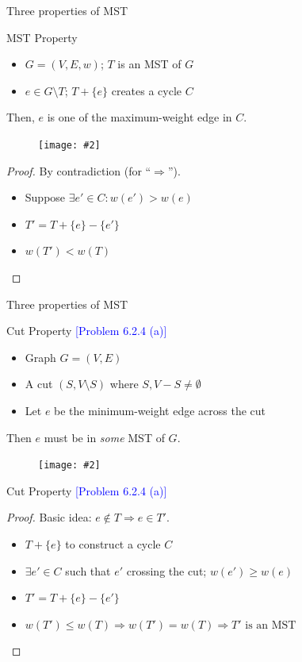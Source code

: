\documentclass{beamer}
\newcommand{\set}[1]{\{ #1 \}}
\newcommand{\problemno}[1]{\textcolor{blue}{\scriptsize [Problem #1]}}
\newcommand{\fignocaption}[2]
{
  \begin{figure}[htp]
    \centering
      \texttt{[image: \#2]}
  \end{figure}
}
\begin{document}
\begin{frame}{Three properties of MST}
  \begin{block}{MST Property}
    \begin{itemize}
      \item $G = (V, E, w)$; $T$ is an MST of $G$
      \item $e \in G \setminus T$; $T + \set{e}$ creates a cycle $C$
    \end{itemize}
    Then, $e$ is one of the maximum-weight edge in $C$.
  \end{block}

  \fignocaption{width = 0.30\textwidth}{fig/mst-property.pdf}

  \begin{proof}
	By contradiction (for ``$\Rightarrow$'').
	\begin{itemize}
	  \item Suppose $\exists e' \in C: w(e') > w(e)$
	  \item $T' = T + \set{e} - \set{e'}$
	  \item $w(T') < w(T)$
	\end{itemize}
  \end{proof}
\end{frame}
\begin{frame}{Three properties of MST}
  \begin{block}{Cut Property \problemno{6.2.4 (a)}}
    \begin{itemize}
	  \item Graph $G = (V, E)$
	  \item A cut $(S, V \setminus S)$ where $S, V-S \neq \emptyset$
	  \item Let $e$ be the minimum-weight edge across the cut
	\end{itemize}
	Then $e$ must be in \emph{some} MST of $G$.
  \end{block}

  \fignocaption{width = 0.40\textwidth}{fig/cut-property-no-name.pdf}
\end{frame}
\begin{frame}
  \begin{block}{Cut Property \problemno{6.2.4 (a)}}
  \begin{proof}
    Basic idea: $e \notin T \Rightarrow e \in T'$.
	\begin{itemize}
	  \item $T + \set{e}$ to construct a cycle $C$
	  \item $\exists e'\in C$ such that $e'$ crossing the cut; $w(e')
	  \geq w(e)$
	  \item $T' = T + \set{e} - \set{e'}$
	  \item $w(T') \le w(T) \Rightarrow w(T') = w(T) \Rightarrow T' \textrm{ is
	  an MST}$
	\end{itemize}
  \end{proof}
  \end{block}
\end{frame}
\end{document}
